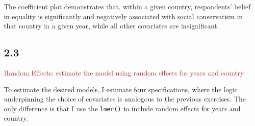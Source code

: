 \documentclass[
]{article}
\begin{document}
The coefficient plot demonstrates that, within a given country,
respondents' belief in equality is significantly and negatively
associated with social conservatism in that country in a given year,
while all other covariates are insignificant.

\hypertarget{section-7}{%
\subsection{2.3}\label{section-7}}

\textcolor{brown}{Random Effects: estimate the model using random effects for years and country}

To estimate the desired models, I estimate four specifications, where
the logic underpinning the choice of covariates is analogous to the
previous exercises. The only difference is that I use the
\texttt{lmer()} to include random effects for years and country.
\end{document}

